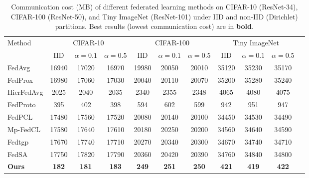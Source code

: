 \documentclass[twoside]{article}
\begin{document}
        \begin{table}[t]
        \centering
        \caption{Communication cost (MB) of different federated learning methods on CIFAR-10 (ResNet-34), CIFAR-100 (ResNet-50), and Tiny ImageNet (ResNet-101) under IID and non-IID (Dirichlet) partitions. Best results (lowest communication cost) are in \textbf{bold}.}
        \label{tab:comm_cost_iid_dir}
        \begin{tabular}{lcccccccccc}
        \toprule
        \multirow{2}{*}{Method} & \multicolumn{3}{c}{CIFAR-10} & \multicolumn{3}{c}{CIFAR-100} & \multicolumn{3}{c}{Tiny ImageNet} \\
         & IID & $\alpha{=}0.1$ & $\alpha{=}0.5$ & IID & $\alpha{=}0.1$ & $\alpha{=}0.5$ & IID & $\alpha{=}0.1$ & $\alpha{=}0.5$ \\
        \midrule
        FedAvg     & 16940 & 17020 & 16970 & 19980 & 20050 & 20010 & 35120 & 35230 & 35170 \\
        FedProx    & 16980 & 17060 & 17030 & 20040 & 20110 & 20070 & 35200 & 35280 & 35240 \\
        HierFedAvg & 2025  & 2040  & 2035  & 2340  & 2355  & 2348  & 4065  & 4080  & 4075  \\
        FedProto   & 395   & 402   & 398   & 594   & 602   & 599   & 942   & 951   & 947   \\
        FedPCL     & 17480 & 17560 & 17520 & 20080 & 20140 & 20100 & 34450 & 34530 & 34490 \\
        Mp-FedCL   & 17580 & 17640 & 17610 & 20180 & 20250 & 20200 & 34560 & 34640 & 34590 \\
        Fedtgp     & 17670 & 17740 & 17710 & 20270 & 20340 & 20300 & 34670 & 34740 & 34710 \\
        FedSA      & 17750 & 17820 & 17790 & 20360 & 20420 & 20390 & 34760 & 34840 & 34800 \\
        \midrule
        \textbf{Ours} & \textbf{182} & \textbf{181} & \textbf{183} & \textbf{249} & \textbf{251} & \textbf{250} & \textbf{421} & \textbf{419} & \textbf{422} \\
        \bottomrule
        \end{tabular}
        \end{table}
        
\end{document}
